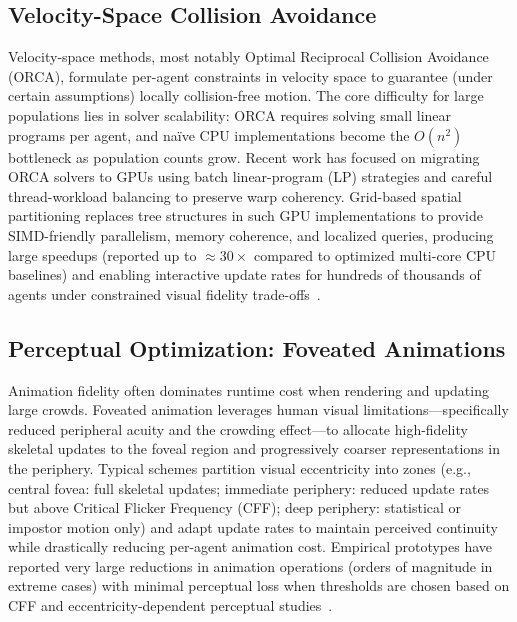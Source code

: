\subsection{Velocity-Space Collision Avoidance}
Velocity-space methods, most notably Optimal Reciprocal Collision Avoidance (ORCA), formulate per-agent constraints in velocity space to guarantee (under certain assumptions) locally collision-free motion. The core difficulty for large populations lies in solver scalability: ORCA requires solving small linear programs per agent, and naïve CPU implementations become the $O(n^{2})$ bottleneck as population counts grow. Recent work has focused on migrating ORCA solvers to GPUs using batch linear-program (LP) strategies and careful thread-workload balancing to preserve warp coherency. Grid-based spatial partitioning replaces tree structures in such GPU implementations to provide SIMD-friendly parallelism, memory coherence, and localized queries, producing large speedups (reported up to $\approx 30\times$ compared to optimized multi-core CPU baselines) and enabling interactive update rates for hundreds of thousands of agents under constrained visual fidelity trade-offs~\cite{charlton}.

\subsection{Perceptual Optimization: Foveated Animations}
Animation fidelity often dominates runtime cost when rendering and updating large crowds. Foveated animation leverages human visual limitations—specifically reduced peripheral acuity and the crowding effect—to allocate high-fidelity skeletal updates to the foveal region and progressively coarser representations in the periphery. Typical schemes partition visual eccentricity into zones (e.g., central fovea: full skeletal updates; immediate periphery: reduced update rates but above Critical Flicker Frequency (CFF); deep periphery: statistical or impostor motion only) and adapt update rates to maintain perceived continuity while drastically reducing per-agent animation cost. Empirical prototypes have reported very large reductions in animation operations (orders of magnitude in extreme cases) with minimal perceptual loss when thresholds are chosen based on CFF and eccentricity-dependent perceptual studies~\cite{stancu}.

